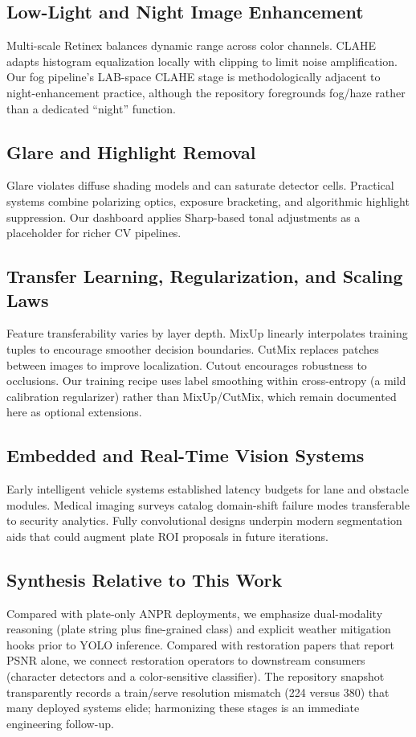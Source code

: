 \subsection{Low-Light and Night Image Enhancement}
Multi-scale Retinex balances dynamic range across color channels. CLAHE adapts histogram equalization locally with clipping to limit noise amplification. Our fog pipeline's LAB-space CLAHE stage is methodologically adjacent to night-enhancement practice, although the repository foregrounds fog/haze rather than a dedicated ``night'' function.

\subsection{Glare and Highlight Removal}
Glare violates diffuse shading models and can saturate detector cells. Practical systems combine polarizing optics, exposure bracketing, and algorithmic highlight suppression. Our dashboard applies Sharp-based tonal adjustments as a placeholder for richer CV pipelines.

\subsection{Transfer Learning, Regularization, and Scaling Laws}
Feature transferability varies by layer depth. MixUp linearly interpolates training tuples to encourage smoother decision boundaries. CutMix replaces patches between images to improve localization. Cutout encourages robustness to occlusions. Our training recipe uses label smoothing within cross-entropy (a mild calibration regularizer) rather than MixUp/CutMix, which remain documented here as optional extensions.

\subsection{Embedded and Real-Time Vision Systems}
Early intelligent vehicle systems established latency budgets for lane and obstacle modules. Medical imaging surveys catalog domain-shift failure modes transferable to security analytics. Fully convolutional designs underpin modern segmentation aids that could augment plate ROI proposals in future iterations.

\subsection{Synthesis Relative to This Work}
Compared with plate-only ANPR deployments, we emphasize dual-modality reasoning (plate string plus fine-grained class) and explicit weather mitigation hooks prior to YOLO inference. Compared with restoration papers that report PSNR alone, we connect restoration operators to downstream consumers (character detectors and a color-sensitive classifier). The repository snapshot transparently records a train/serve resolution mismatch (224 versus 380) that many deployed systems elide; harmonizing these stages is an immediate engineering follow-up.
